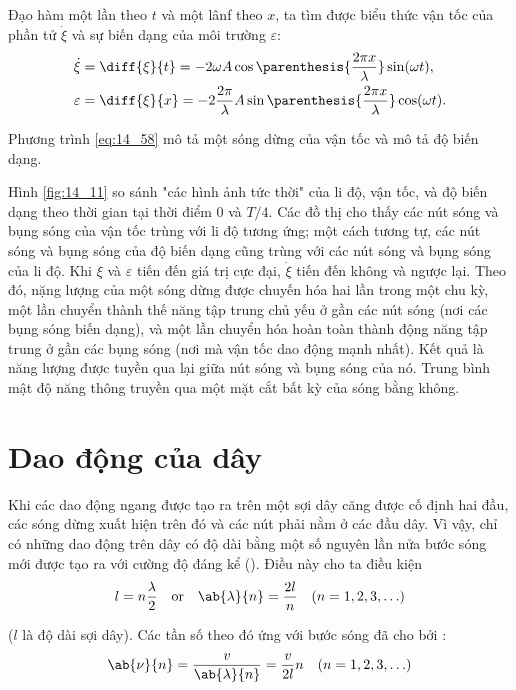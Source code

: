 Đạo hàm  một lần theo $t$ và một lânf theo $x$, ta tìm được biểu thức vận tốc của phần tử $\dot{\xi}$ và sự biến dạng của môi trường $\varepsilon$:
\begin{align}
	\dot{\xi} &= \diff{\xi}{t} = - 2 \omega A \cos\parenthesis{ \frac{2\pi x}{\lambda} } \sin(\omega t), \label{eq:14_58}\\
	\varepsilon &= \diff{\xi}{x} = - 2 \frac{2\pi}{\lambda} A \sin\parenthesis{ \frac{2\pi x}{\lambda} } \cos(\omega t). \label{eq:14_59}
\end{align}

\noindent
Phương trình \eqref{eq:14_58} mô tả một sóng dừng của vận tốc và  mô tả độ biến dạng.

Hình \ref{fig:14_11} so sánh "các hình ảnh tức thời" của li độ, vận tốc, và độ biến dạng theo thời gian tại thời điểm $0$ và $T/4$. Các đồ thị cho thấy các nút sóng và bụng sóng của vận tốc trùng với li độ tương ứng; một cách tương tự, các nút sóng và bụng sóng của độ biến dạng cũng trùng với các nút sóng và bụng sóng của li độ. Khi $\xi$ và $\varepsilon$ tiến đến giá trị cực đại, $\dot{\xi}$ tiến đến không và ngược lại. Theo đó, nặng lượng của một sóng dừng được chuyến hóa hai lần trong một chu kỳ, một lần chuyển thành thế năng tập trung chủ yếu ở gần các nút sóng (nơi các bụng sóng biến dạng), và một lần chuyển hóa hoàn toàn thành động năng tập trung ở gần các bụng sóng (nơi mà vận tốc dao động mạnh nhất). Kết quả là năng lượng được tuyền qua lại giữa nút sóng và bụng sóng của nó. Trung bình mật độ năng thông truyền qua một mặt cắt bất kỳ của sóng bằng không.

\section{Dao động của dây}\label{sec:14_8}

Khi các dao động ngang được tạo ra trên một sợi dây căng được cố định hai đầu, các sóng dừng xuất hiện trên đó và các nút phải nằm ở các đầu dây. Vì vậy, chỉ có những dao động trên dây có độ dài bằng một số nguyên lần nửa bước sóng mới được tạo ra với cường độ đáng kể (). Điều này cho ta điều kiện
\begin{equation}\label{eq:14_60}
	l = n \frac{\lambda}{2}\quad \text{or}\quad \ab{\lambda}{n} = \frac{2l}{n}\quad (n = 1, 2, 3, \ldots)
\end{equation}

\noindent
($l$ là độ dài sợi dây). Các tần số theo đó ứng với bước sóng đã cho bởi :
\begin{equation}\label{eq:14_61}
	\ab{\nu}{n} = \frac{v}{\ab{\lambda}{n}} = \frac{v}{2l} n \quad (n = 1, 2, 3, \ldots)
\end{equation}

